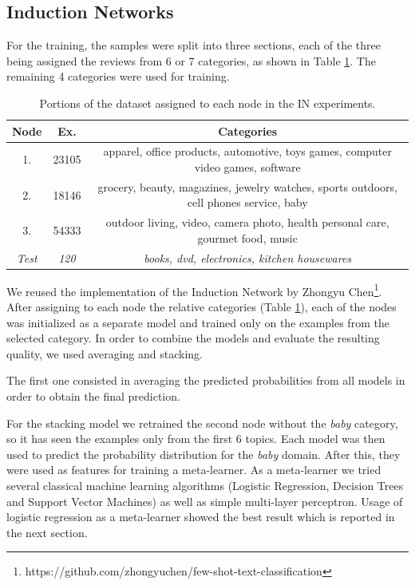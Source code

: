 \documentclass{esannV2}
\begin{document}
    \subsection{Induction Networks}
    For the training, the samples were split into three sections, each of the three being assigned the reviews from 6 or 7 categories, as shown in Table \ref{tab:cats_in}. The remaining 4 categories were used for training.
        
    \setlength\parindent{24pt}
    \begin{table}[h!]
    \centering
    \hspace*{-50pt}\begin{tabular}{|c|c|c|}
    \hline
    Node & Ex. & Categories\\
    \hline
    1. & 23105 & apparel, office products, automotive, toys games, computer video games, software\\
    2. & 18146 & grocery, beauty, magazines, jewelry watches, sports outdoors, cell phones service, baby\\
    3. & 54333 & outdoor living, video, camera photo, health personal care, gourmet food, music\\
    \textit{Test} & \textit{120} & \textit{books, dvd, electronics, kitchen housewares}\\
    \hline
    \end{tabular}
    \caption{Portions of the dataset assigned to each node in the IN experiments.}\label{tab:cats_in}
    \end{table}
    
    We reused the implementation of the Induction Network by Zhongyu Chen\footnote{https://github.com/zhongyuchen/few-shot-text-classification}. After assigning to each node the relative categories (Table \ref{tab:cats_in}), each of the nodes was initialized as a separate model and trained only on the examples from the selected category. In order to combine the models and evaluate the resulting quality, we used averaging and stacking.
    
    The first one consisted in averaging the predicted probabilities from all models in order to obtain the final prediction. 
    
    For the stacking model we retrained the second node without the \textit{baby} category, so it has seen the examples only from the first 6 topics. Each model was then used to predict the probability distribution for the \textit{baby} domain. After this, they were used as features for training a meta-learner. As a meta-learner we tried several classical machine learning algorithms (Logistic Regression, Decision Trees and Support Vector Machines) as well as simple multi-layer perceptron. Usage of logistic regression as a meta-learner showed the best result which is reported in the next section.
    
\end{document}
